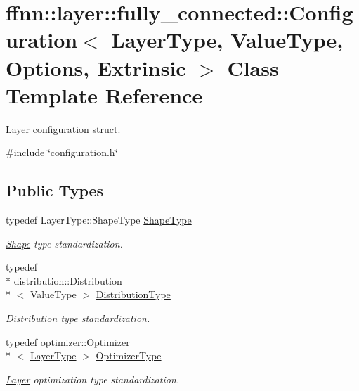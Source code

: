 \hypertarget{classffnn_1_1layer_1_1fully__connected_1_1_configuration}{\section{ffnn\-:\-:layer\-:\-:fully\-\_\-connected\-:\-:Configuration$<$ Layer\-Type, Value\-Type, Options, Extrinsic $>$ Class Template Reference}
\label{classffnn_1_1layer_1_1fully__connected_1_1_configuration}
}


\hyperlink{classffnn_1_1layer_1_1_layer}{Layer} configuration struct.  




{\ttfamily \#include \char`\"{}configuration.\-h\char`\"{}}

\subsection*{Public Types}
\begin{DoxyCompactItemize}
\item 
typedef Layer\-Type\-::\-Shape\-Type \hyperlink{classffnn_1_1layer_1_1fully__connected_1_1_configuration_ade943726f101a3d900d19c72707a56a3}{Shape\-Type}
\begin{DoxyCompactList}\small\item\em \hyperlink{structffnn_1_1layer_1_1_shape}{Shape} type standardization. \end{DoxyCompactList}\item 
typedef \\*
\hyperlink{classffnn_1_1distribution_1_1_distribution}{distribution\-::\-Distribution}\\*
$<$ Value\-Type $>$ \hyperlink{classffnn_1_1layer_1_1fully__connected_1_1_configuration_a898b9f9b53bccc645867242b7fa163e9}{Distribution\-Type}
\begin{DoxyCompactList}\small\item\em Distribution type standardization. \end{DoxyCompactList}\item 
typedef \hyperlink{classffnn_1_1optimizer_1_1_optimizer}{optimizer\-::\-Optimizer}\\*
$<$ \hyperlink{classffnn_1_1layer_1_1fully__connected_1_1_configuration_a935cd081500398ecc6c5ed195dbc9402}{Layer\-Type} $>$ \hyperlink{classffnn_1_1layer_1_1fully__connected_1_1_configuration_ab1936b042b4c8a89da3031e2d5e767e4}{Optimizer\-Type}
\begin{DoxyCompactList}\small\item\em \hyperlink{classffnn_1_1layer_1_1_layer}{Layer} optimization type standardization. \end{DoxyCompactList}\end{DoxyCompactItemize}
